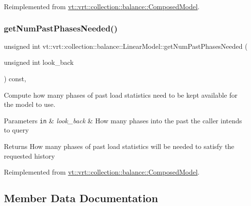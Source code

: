 Reimplemented from \hyperlink{classvt_1_1vrt_1_1collection_1_1balance_1_1_composed_model_a07737f979ebca207a76e6b810c386409}{vt\+::vrt\+::collection\+::balance\+::\+Composed\+Model}.

\mbox{\label{structvt_1_1vrt_1_1collection_1_1balance_1_1_linear_model_ae1a9d609a834df8d672992de8184e458}} 
\subsubsection{\texorpdfstring{get\+Num\+Past\+Phases\+Needed()}{getNumPastPhasesNeeded()}}
{\footnotesize\ttfamily unsigned int vt\+::vrt\+::collection\+::balance\+::\+Linear\+Model\+::get\+Num\+Past\+Phases\+Needed (\begin{DoxyParamCaption}\item[{unsigned int}]{look\+\_\+back }\end{DoxyParamCaption}) const\hspace{0.3cm}{\ttfamily [override]}, {\ttfamily [virtual]}}



Compute how many phases of past load statistics need to be kept available for the model to use. 


\begin{DoxyParams}[1]{Parameters}
\mbox{\tt in}  & {\em look\+\_\+back} & How many phases into the past the caller intends to query\\
\hline
\end{DoxyParams}
\begin{DoxyReturn}{Returns}
How many phases of past load statistics will be needed to satisfy the requested history 
\end{DoxyReturn}


Reimplemented from \hyperlink{classvt_1_1vrt_1_1collection_1_1balance_1_1_composed_model_a20bb994d1b3b27eb2a82729d7d5c30f3}{vt\+::vrt\+::collection\+::balance\+::\+Composed\+Model}.



\subsection{Member Data Documentation}
\mbox{\label{structvt_1_1vrt_1_1collection_1_1balance_1_1_linear_model_a5735a20dfd17fb2804a1b9b90d5649d1}} 
